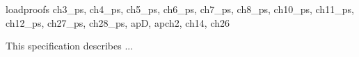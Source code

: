 \documentclass{article}
\begin{document}
\begin{zsection}
  \SECTION loadproofs \parents ch3\_ps, ch4\_ps, ch5\_ps, ch6\_ps, ch7\_ps, ch8\_ps, ch10\_ps, 
  								ch11\_ps, ch12\_ps, ch27\_ps, ch28\_ps, apD, apch2, ch14, ch26
\end{zsection}

This specification describes ...
\end{document}
